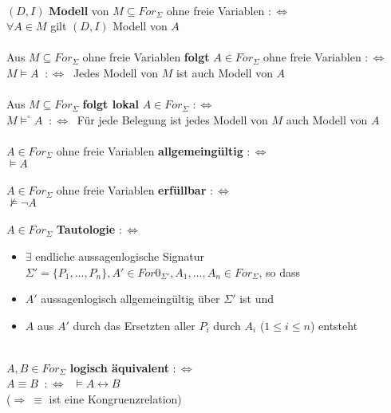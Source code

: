 \documentclass[a4paper,11pt]{scrartcl}
\newcommand{\tbf}{\textbf}
\newcommand{\Lra}{\Leftrightarrow}
\newcommand{\fol}{\vDash}
\newcommand{\nfol}{\nvDash}
\newcommand{\For}{For_\Sigma}
\theoremstyle{default}
\begin{document}
\ \\ $(D, I)$ \tbf{Modell} von $M \subseteq \For$ ohne freie Variablen $:\Lra$ \\
$\forall A \in M$ gilt $(D, I)$ Modell von $A$ \\
\ \\ Aus $M \subseteq \For$ ohne freie Variablen \tbf{folgt} $A \in \For$ ohne freie Variablen $:\Lra$ \\
$M \fol A$ $\ :\Lra \ $ Jedes Modell von $M$ ist auch Modell von $A$ \\
\ \\ Aus $M \subseteq \For$ \tbf{folgt lokal} $A \in \For$ $:\Lra$ \\
$M \fol^\circ A$ $\ :\Lra \ $ Für jede Belegung ist jedes Modell von $M$ auch Modell von $A$ \\
\ \\ $A \in \For$ ohne freie Variablen \tbf{allgemeingültig} $:\Lra$ \\
$\fol A$ \\
\ \\ $A \in \For$ ohne freie Variablen \tbf{erfüllbar} $:\Lra$ \\
$\nfol \neg A$ \\
\ \\ $A \in \For$ \tbf{Tautologie} $:\Lra$
\begin{itemize}
 \item $\exists$ endliche aussagenlogische Signatur $\Sigma' = \{P_1, ..., P_n\}, A' \in For0_{\Sigma'}, A_1, ..., A_n \in \For$, so dass
 \item $A'$ aussagenlogisch allgemeingültig über $\Sigma'$ ist und
 \item $A$ aus $A'$ durch das Ersetzten aller $P_i$ durch $A_i$ ($1 \leq i \leq n$) entsteht
\end{itemize}

  
\ \\ $A, B \in \For$ \tbf{logisch äquivalent} $:\Lra$ \\
$A \equiv B$ $\ :\Lra \ $ $\fol A \leftrightarrow B$ \\
($\Rightarrow \ \equiv$ ist eine Kongruenzrelation) \\
\end{document}
